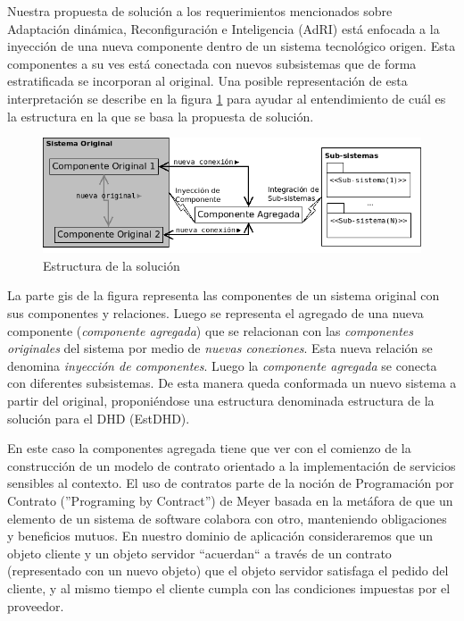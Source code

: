 {Nuestra propuesta de solución a los requerimientos mencionados sobre
Adaptación dinámica, Reconfiguración e Inteligencia (AdRI) está enfocada a la
inyección de una nueva componente dentro de un sistema tecnológico origen. Esta
componentes a su ves está conectada con nuevos subsistemas que de forma
estratificada se incorporan al original. Una posible representación de esta
interpretación se describe en la figura \ref{fig:solucion} para ayudar al
entendimiento de cuál es la estructura en la que se basa la propuesta de
solución.


\begin{figure}[h]
\begin{center}
 \includegraphics[width=4 in,totalheight=3 in] {Ch0/solucion}
\caption{Estructura de la solución} \label{fig:solucion}
\end{center}
\end{figure}

La parte gis de la figura representa las componentes de un sistema original
con sus componentes y relaciones. Luego se representa el agregado de una nueva
componente (\textit{componente agregada}) que se relacionan con las
\textit{componentes originales} del sistema por medio de \textit{nuevas
conexiones}. Esta nueva relación se denomina \textit{inyección de componentes}.
Luego la \textit{componente agregada} se conecta con diferentes subsistemas. De
esta manera queda conformada un nuevo sistema a partir del
original, proponiéndose una estructura denominada estructura de la solución para
el DHD (EstDHD).

En este caso la componentes agregada tiene que ver con el comienzo de la
construcción de un modelo de contrato orientado a la implementación de servicios
sensibles al contexto. El uso de contratos parte de la noción de Programación
por Contrato (”Programing by Contract”) de Meyer \cite{cap1.11} basada en la
metáfora de que un elemento de un sistema de software colabora con otro,
manteniendo obligaciones y beneficios mutuos. En nuestro dominio de aplicación
consideraremos que un objeto cliente y un objeto servidor “acuerdan“ a través de
un contrato (representado con un nuevo objeto) que el objeto servidor satisfaga
el pedido del cliente, y al mismo tiempo el cliente cumpla con las condiciones
impuestas por el proveedor.


}
